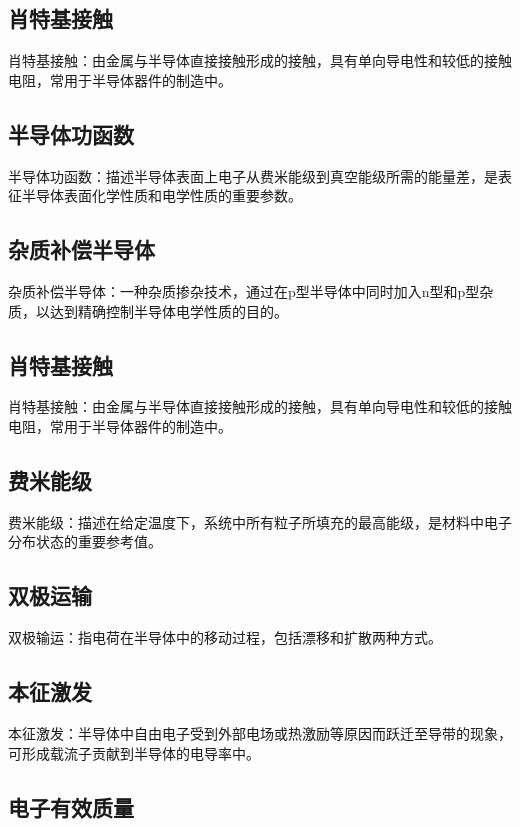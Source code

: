 \documentclass{report}          %
\begin{document}
\subsection{肖特基接触}

肖特基接触：由金属与半导体直接接触形成的接触，具有单向导电性和较低的接触电阻，常用于半导体器件的制造中。

\subsection{半导体功函数}

半导体功函数：描述半导体表面上电子从费米能级到真空能级所需的能量差，是表征半导体表面化学性质和电学性质的重要参数。

\subsection{杂质补偿半导体}

杂质补偿半导体：一种杂质掺杂技术，通过在p型半导体中同时加入n型和p型杂质，以达到精确控制半导体电学性质的目的。

\subsection{肖特基接触}

肖特基接触：由金属与半导体直接接触形成的接触，具有单向导电性和较低的接触电阻，常用于半导体器件的制造中。

\subsection{费米能级}

费米能级：描述在给定温度下，系统中所有粒子所填充的最高能级，是材料中电子分布状态的重要参考值。

\subsection{双极运输}

双极输运：指电荷在半导体中的移动过程，包括漂移和扩散两种方式。

\subsection{本征激发}

本征激发：半导体中自由电子受到外部电场或热激励等原因而跃迁至导带的现象，可形成载流子贡献到半导体的电导率中。

\subsection{电子有效质量}
\end{document}
